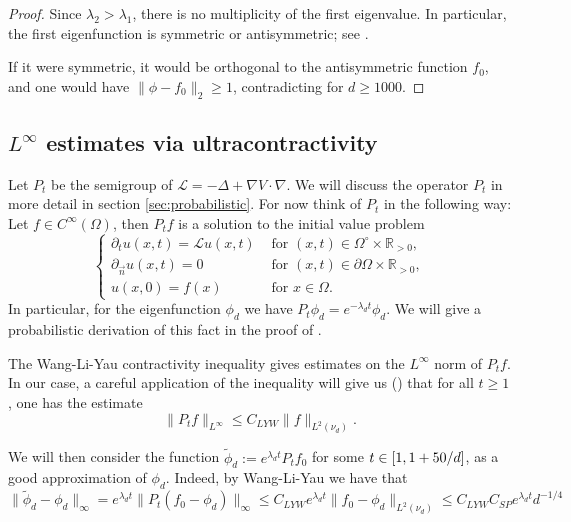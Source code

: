 \begin{proof}
    Since $\lambda_2>\lambda_1$, there is no multiplicity of the first eigenvalue. In particular, the first eigenfunction is symmetric or antisymmetric; see .

    If it were symmetric, it would be orthogonal to the antisymmetric function $f_0$, and one would have $\|\phi - f_0\|_2\ge 1$, contradicting  for $d\ge 1000$.
\end{proof}

\subsection{$L^\infty$ estimates via ultracontractivity}

Let $P_t$ be the semigroup of $\mathcal{L} = -\Delta + \nabla V \cdot \nabla$. We will discuss the operator $P_t$ in more detail in section \ref{sec:probabilistic}. For now think of $P_t$ in the following way: Let $f \in C^\infty(\Omega)$, then $P_t f$ is a solution to the initial value problem
\begin{equation}
    \begin{cases}
        \partial_t u(x,t) = \mathcal{L} u(x,t) & \text{ for } (x,t)\in \Omega^\circ\times \mathbb R_{>0}, \\
        \partial_{\vec{n}} u(x,t) = 0 &\text{ for } (x,t)\in \partial \Omega \times \mathbb R_{>0}, \\
        u(x,0) = f(x) &\text{ for } x \in \Omega.
    \end{cases}
\end{equation}
In particular, for the eigenfunction $\phi_d$ we have $P_t \phi_d = e^{-\lambda_d t} \phi_d$. We will give a probabilistic derivation of this fact in the proof of .

The Wang-Li-Yau contractivity inequality gives estimates on the $L^\infty$ norm of $P_t f$. In our case, a careful application of the inequality will give us () that for all $t\ge 1$, one has the estimate
$$
\|P_t f\|_{L^\infty} \le C_{LYW} \|f\|_{L^2(\nu_d)}. 
$$

We will then consider the function $\tilde \phi_d := e^{\lambda_d t}P_t f_0$ for some $t \in [1,1+50/d]$, as a good approximation of $\phi_d$. Indeed, by Wang-Li-Yau we have that
$$
\|\tilde \phi_d - \phi_d\|_\infty =
e^{\lambda_d t}
\|P_t (f_0 - \phi_d)\|_\infty
\le C_{LYW}  e^{\lambda_d t}
\|f_0 - \phi_d\|_{L^2(\nu_d)}
\le C_{LYW} 
C_{SP}  e^{\lambda_d t} d^{-1/4}
$$

